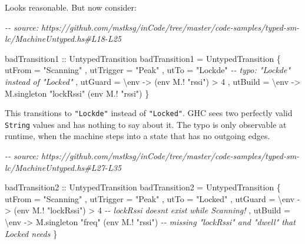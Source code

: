 \documentclass[]{article}
\newenvironment{Shaded}{}{}
\newcommand{\CommentTok}[1]{\textcolor[rgb]{0.38,0.63,0.69}{\textit{#1}}}
\newcommand{\DataTypeTok}[1]{\textcolor[rgb]{0.56,0.13,0.00}{#1}}
\newcommand{\DecValTok}[1]{\textcolor[rgb]{0.25,0.63,0.44}{#1}}
\newcommand{\NormalTok}[1]{#1}
\newcommand{\OperatorTok}[1]{\textcolor[rgb]{0.40,0.40,0.40}{#1}}
\newcommand{\OtherTok}[1]{\textcolor[rgb]{0.00,0.44,0.13}{#1}}
\newcommand{\StringTok}[1]{\textcolor[rgb]{0.25,0.44,0.63}{#1}}
\begin{document}
Looks reasonable. But now consider:

\begin{Shaded}
\begin{Highlighting}[]
\CommentTok{{-}{-} source: https://github.com/mstksg/inCode/tree/master/code{-}samples/typed{-}sm{-}lc/MachineUntyped.hs\#L18{-}L25}

\OtherTok{badTransition1 ::} \DataTypeTok{UntypedTransition}
\NormalTok{badTransition1 }\OtherTok{=} \DataTypeTok{UntypedTransition}
\NormalTok{  \{ utFrom    }\OtherTok{=} \StringTok{"Scanning"}
\NormalTok{  , utTrigger }\OtherTok{=} \StringTok{"Peak"}
\NormalTok{  , utTo      }\OtherTok{=} \StringTok{"Lockde"}          \CommentTok{{-}{-} typo: "Lockde" instead of "Locked"}
\NormalTok{  , utGuard   }\OtherTok{=}\NormalTok{ \textbackslash{}env }\OtherTok{{-}\textgreater{}}\NormalTok{ (env }\OperatorTok{M.!} \StringTok{"rssi"}\NormalTok{) }\OperatorTok{\textgreater{}} \DecValTok{4}
\NormalTok{  , utBuild   }\OtherTok{=}\NormalTok{ \textbackslash{}env }\OtherTok{{-}\textgreater{}}\NormalTok{ M.singleton }\StringTok{"lockRssi"}\NormalTok{ (env }\OperatorTok{M.!} \StringTok{"rssi"}\NormalTok{)}
\NormalTok{  \}}
\end{Highlighting}
\end{Shaded}

This transitions to \texttt{"Lockde"} instead of \texttt{"Locked"}. GHC sees two
perfectly valid \texttt{String} values and has nothing to say about it. The typo
is only observable at runtime, when the machine steps into a state that has no
outgoing edges.

\begin{Shaded}
\begin{Highlighting}[]
\CommentTok{{-}{-} source: https://github.com/mstksg/inCode/tree/master/code{-}samples/typed{-}sm{-}lc/MachineUntyped.hs\#L27{-}L35}

\OtherTok{badTransition2 ::} \DataTypeTok{UntypedTransition}
\NormalTok{badTransition2 }\OtherTok{=} \DataTypeTok{UntypedTransition}
\NormalTok{  \{ utFrom    }\OtherTok{=} \StringTok{"Scanning"}
\NormalTok{  , utTrigger }\OtherTok{=} \StringTok{"Peak"}
\NormalTok{  , utTo      }\OtherTok{=} \StringTok{"Locked"}
\NormalTok{  , utGuard   }\OtherTok{=}\NormalTok{ \textbackslash{}env }\OtherTok{{-}\textgreater{}}\NormalTok{ (env }\OperatorTok{M.!} \StringTok{"lockRssi"}\NormalTok{) }\OperatorTok{\textgreater{}} \DecValTok{4}  \CommentTok{{-}{-} lockRssi doesn\textquotesingle{}t exist while Scanning!}
\NormalTok{  , utBuild   }\OtherTok{=}\NormalTok{ \textbackslash{}env }\OtherTok{{-}\textgreater{}}\NormalTok{ M.singleton }\StringTok{"freq"}\NormalTok{ (env }\OperatorTok{M.!} \StringTok{"rssi"}\NormalTok{)}
                        \CommentTok{{-}{-} missing "lockRssi" and "dwell" that Locked needs}
\NormalTok{  \}}
\end{Highlighting}
\end{Shaded}
\end{document}
